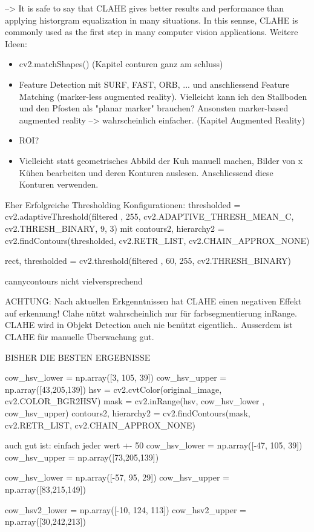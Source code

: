 -->  It is safe to say that CLAHE gives better results and performance than applying historgram equalization in many situations. In this sennse, CLAHE is commonly used as the first step in many computer vision applications.
Weitere Ideen: 

\begin{itemize}

	\item cv2.matchShapes() (Kapitel conturen ganz am schluss)
	\item Feature Detection mit SURF, FAST, ORB, ... und anschliessend Feature Matching (marker-less augmented reality). Vielleicht kann ich den Stallboden und den Pfosten als "planar marker" brauchen? Ansonsten marker-based augmented reality --> wahrscheinlich einfacher. (Kapitel Augmented Reality)
	\item ROI?
	\item Vielleicht statt geometrisches Abbild der Kuh manuell machen, Bilder von x Kühen bearbeiten und deren Konturen auslesen. Anschliessend diese Konturen verwenden.
\end{itemize}

Eher Erfolgreiche Thresholding Konfigurationen:
thresholded  = cv2.adaptiveThreshold(filtered , 255, cv2.ADAPTIVE_THRESH_MEAN_C, cv2.THRESH_BINARY, 9, 3) 
mit contours2, hierarchy2 = cv2.findContours(thresholded, cv2.RETR_LIST, cv2.CHAIN_APPROX_NONE)

rect, thresholded = cv2.threshold(filtered , 60, 255, cv2.THRESH_BINARY)

cannycontours nicht vielversprechend

ACHTUNG: Nach aktuellen Erkgenntnissen hat CLAHE einen negativen Effekt auf erkennung! Clahe nützt wahrscheinlich nur für farbsegmentierung inRange. CLAHE wird in Objekt Detection auch nie benützt eigentlich.. Ausserdem ist CLAHE für manuelle Überwachung gut. 


BISHER DIE BESTEN ERGEBNISSE

cow_hsv_lower = np.array([3, 105, 39])
cow_hsv_upper = np.array([43,205,139])
hsv = cv2.cvtColor(original_image, cv2.COLOR_BGR2HSV)
mask = cv2.inRange(hsv, cow_hsv_lower , cow_hsv_upper)
contours2, hierarchy2 = cv2.findContours(mask, cv2.RETR_LIST, cv2.CHAIN_APPROX_NONE)


auch gut ist: einfach jeder wert +- 50
cow_hsv_lower = np.array([-47, 105, 39])
cow_hsv_upper = np.array([73,205,139])

cow_hsv_lower = np.array([-57, 95, 29])
cow_hsv_upper = np.array([83,215,149])

cow_hsv2_lower = np.array([-10, 124, 113])
cow_hsv2_upper = np.array([30,242,213])




